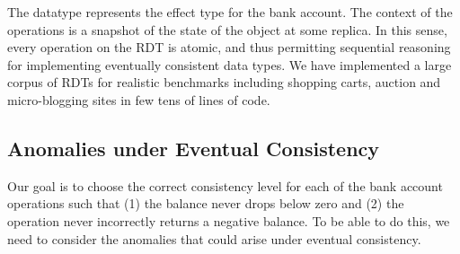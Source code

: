 \begin{figure}
\label{Definition of a bank account expressed in Quelea.}
\label{fig:ex}
\end{figure}

The datatype  represents the effect type for the bank account. The
context of the operations is a snapshot of the state of the object at some
replica. In this sense, every operation on the RDT is atomic, and thus
permitting sequential reasoning for implementing eventually consistent data
types. We have implemented a large corpus of RDTs for realistic benchmarks
including shopping carts, auction and micro-blogging sites in few tens of lines
of code.

\subsection{Anomalies under Eventual Consistency}

Our goal is to choose the correct consistency level for each of the bank
account operations such that (1) the balance never drops below zero and (2) the
 operation never incorrectly returns a negative balance. To be
able to do this, we need to consider the anomalies that could arise under
eventual consistency.

